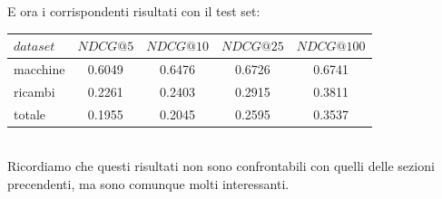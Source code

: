 E ora i corrispondenti risultati con il test set:\\

\begin{tabular}{|l|cccc|}
    \toprule
    $dataset$  &  $NDCG@5$ & $NDCG@10$  & $NDCG@25$ & $NDCG@100$  \\
    \midrule
    macchine & 0.6049 & 0.6476 & 0.6726 & 0.6741 \\
    ricambi & 0.2261 & 0.2403 & 0.2915 & 0.3811 \\
    totale  & 0.1955 & 0.2045 & 0.2595 & 0.3537 \\
\bottomrule
\end{tabular}\\

Ricordiamo che questi risultati non sono confrontabili con quelli delle sezioni precendenti, ma sono comunque molti interessanti.